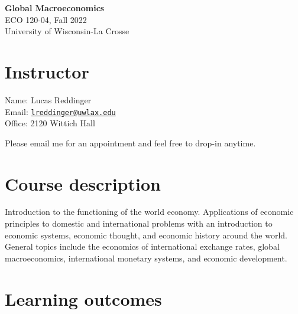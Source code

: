 \documentclass[
    letterpaper,paper=portrait,fleqn,
    DIV=16,fontsize=11pt,twoside=semi,
    parskip=full-,
    headings=standardclasses]
{scrartcl}
\begin{document}
\RaggedRight
\thispagestyle{plain}

\phantom{.}

{\centering
\textbf{\huge Global Macroeconomics}\\
\vspace{\baselineskip}
{\Large ECO 120-04, Fall 2022}\\
\vspace{\baselineskip}
{\Large University of Wisconsin-La Crosse}\\
\vspace{2\baselineskip}
}

\section*{Instructor}

Name: Lucas Reddinger \\
Email: \href{mailto:lreddinger@uwlax.edu}{\nolinkurl{lreddinger@uwlax.edu}} \\
Office: 2120 Wittich Hall

Please email me for an appointment and feel free to drop-in anytime.

\section*{Course description}

Introduction to the functioning of the world economy. Applications of economic principles to domestic and international problems with an introduction to economic systems, economic thought, and economic history around the world. General topics include the economics of international exchange rates, global macroeconomics, international monetary systems, and economic development.

\section*{Learning outcomes}
\end{document}
